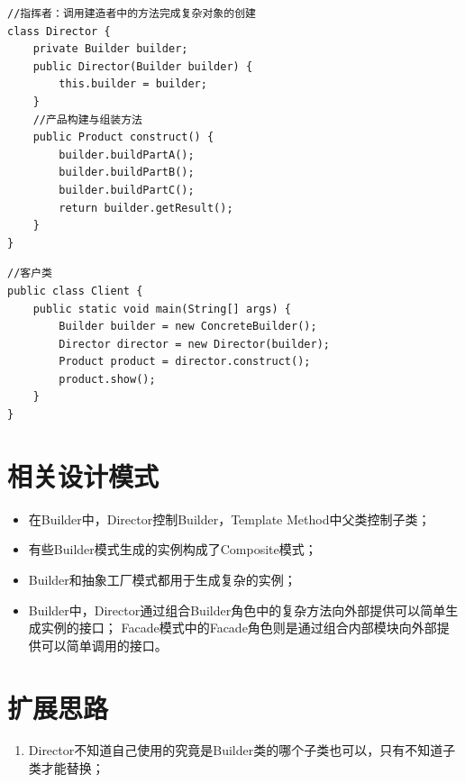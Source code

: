 \begin{lstlisting}
//指挥者：调用建造者中的方法完成复杂对象的创建
class Director {
	private Builder builder;
	public Director(Builder builder) {
		this.builder = builder;
	}
	//产品构建与组装方法
	public Product construct() {
		builder.buildPartA();
		builder.buildPartB();
		builder.buildPartC();
		return builder.getResult();
	}
}
\end{lstlisting}
\begin{lstlisting}
//客户类
public class Client {
	public static void main(String[] args) {
		Builder builder = new ConcreteBuilder();
		Director director = new Director(builder);
		Product product = director.construct();
		product.show();
	}
}
\end{lstlisting}
\section{相关设计模式}
\begin{itemize}
	\item 在Builder中，Director控制Builder，Template Method中父类控制子类；
	\item 有些Builder模式生成的实例构成了Composite模式；
	\item Builder和抽象工厂模式都用于生成复杂的实例；
	\item Builder中，Director通过组合Builder角色中的复杂方法向外部提供可以简单生成实例的接口；
	Facade模式中的Facade角色则是通过组合内部模块向外部提供可以简单调用的接口。
\end{itemize}
\section{扩展思路}
\begin{enumerate}
	\item Director不知道自己使用的究竟是Builder类的哪个子类也可以，只有不知道子类才能替换；
\end{enumerate}
